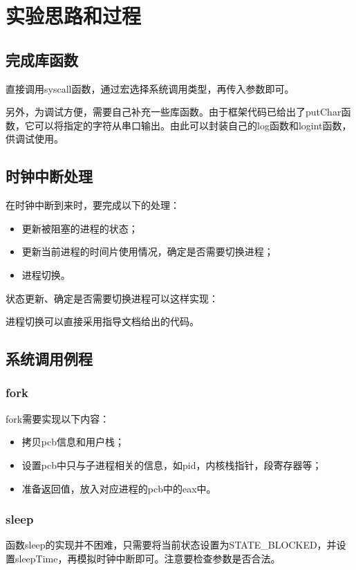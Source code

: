 \documentclass[12pt,a4paper,UTF8]{article}
\begin{document}
\section{实验思路和过程}
\subsection{完成库函数}
直接调用syscall函数，通过宏选择系统调用类型，再传入参数即可。

\par 另外，为调试方便，需要自己补充一些库函数。由于框架代码已给出了putChar函数，它可以将指定的字符从串口输出。由此可以封装自己的log函数和logint函数，供调试使用。


\subsection{时钟中断处理}
在时钟中断到来时，要完成以下的处理：
\begin{itemize}
	\item 更新被阻塞的进程的状态；
	\item 更新当前进程的时间片使用情况，确定是否需要切换进程；
	\item 进程切换。
\end{itemize}
状态更新、确定是否需要切换进程可以这样实现：

\par 进程切换可以直接采用指导文档给出的代码。

\subsection{系统调用例程}
\subsubsection{fork}
fork需要实现以下内容：
\begin{itemize}
	\item 拷贝pcb信息和用户栈；
	\item 设置pcb中只与子进程相关的信息，如pid，内核栈指针，段寄存器等；
	\item 准备返回值，放入对应进程的pcb中的eax中。
\end{itemize}


\subsubsection{sleep}
\par 函数sleep的实现并不困难，只需要将当前状态设置为STATE\_BLOCKED，并设置sleepTime，再模拟时钟中断即可。注意要检查参数是否合法。

\end{document}
